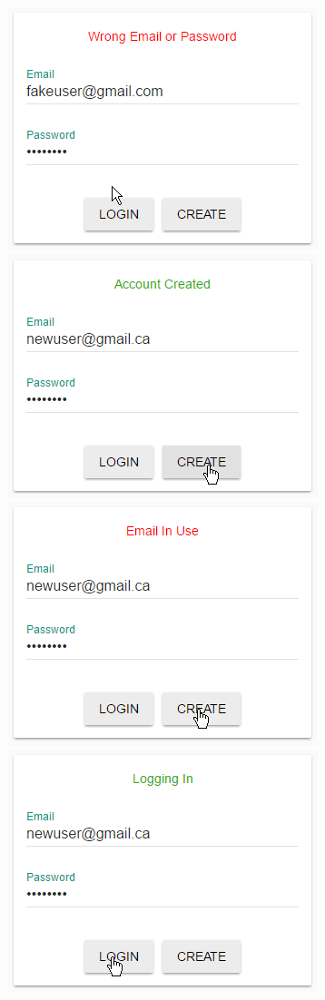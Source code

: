 \documentclass[twoside=false,a4paper,11pt]{article}
\theoremstyle{mytheor}
\begin{document}
\begin{center}
\includegraphics{loginBadAccount.png} \\
\includegraphics{loginNewAccount.png} \\
\includegraphics{loginExistingAccount.png} \\
\includegraphics{login.png} \\


\end{center}
\end{document}
